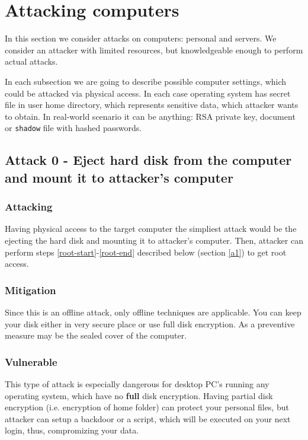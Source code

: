 \section{Attacking computers}
In this section we consider attacks on computers: personal and servers. We consider an attacker with limited resources, but knowledgeable enough to perform actual attacks. 

In each subsection we are going to describe possible computer settings, which could be attacked via physical access. In each case operating system has secret file in user home directory, which represents sensitive data, which attacker wants to obtain. In real-world scenario it can be anything: RSA private key, document or \texttt{shadow} file with hashed passwords.


\subsection{Attack 0 - Eject hard disk from the computer and mount it to attacker's computer} \label{a0}

\subsubsection*{Attacking}
Having physical access to the target computer the simpliest attack would be the ejecting the hard disk and mounting it to attacker's computer. Then, attacker can perform steps \ref{root-start}-\ref{root-end} described below (section \ref{a1}) to get root access.

\subsubsection*{Mitigation}
Since this is an offline attack, only offline techniques are applicable. You can keep your disk either in very secure place or use full disk encryption. As a preventive measure may be the sealed cover of the computer.

\subsubsection*{Vulnerable}
This type of attack is especially dangerous for desktop PC's running any operating system, which have no \textbf{full} disk encryption. Having partial disk encryption (i.e. encryption of home folder) can protect your personal files, but attacker can setup a backdoor or a script, which will be executed on your next login, thus, compromizing your data.


